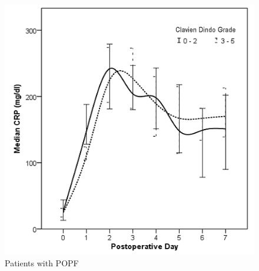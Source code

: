 \documentclass[10pt]{beamer}
\begin{document}
\begin{frame}
\begin{columns}
		\begin{figure}
			\includegraphics[width=\textwidth]{../Figures/crp_comp_infective_leak1}
			\\ Patients with POPF
		\end{figure}
	\end{columns}
\end{frame}
\end{document}
